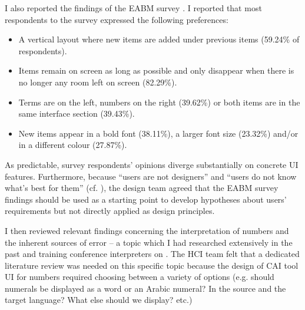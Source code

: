 I also reported the findings of the EABM survey \citep{eabm2021b}. I reported that most respondents to the survey expressed the following preferences:
\begin{itemize}
    \item A vertical layout where new items are added under previous items (59.24\% of respondents).
    \item Items remain on screen as long as possible and only disappear when there is no longer any room left on screen (82.29\%).
    \item Terms are on the left, numbers on the right (39.62\%) or both items are in the same interface section (39.43\%).
    \item New items appear in a bold font (38.11\%), a larger font size (23.32\%) and/or in a different colour (27.87\%).
\end{itemize}
As predictable, survey respondents’ opinions diverge substantially on concrete UI features. Furthermore, because ``users are not designers'' and ``users do not know what’s best for them'' (cf. ), the design team agreed that the EABM survey findings should be used as a starting point to develop hypotheses about users’ requirements but not directly applied as design principles.

I then reviewed relevant findings concerning the interpretation of numbers and the inherent sources of error -- a topic which I had researched extensively in the past \citep{frittella2017numeri,frittella2019a} and training conference interpreters on \citet{frittella2019b}. The HCI team felt that a dedicated literature review was needed on this specific topic because the design of CAI tool UI for numbers required choosing between a variety of options (e.g. should numerals be displayed as a word or an Arabic numeral? In the source and the target language? What else should we display? etc.)


